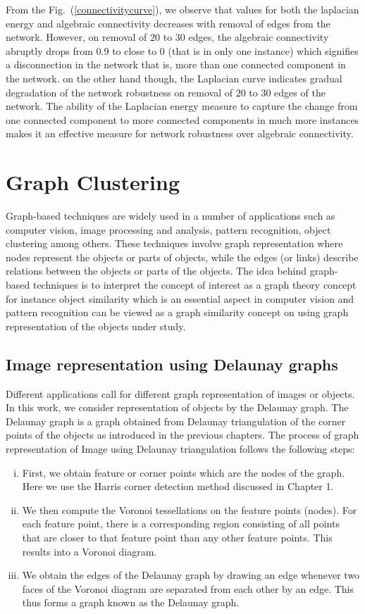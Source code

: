 \documentclass[10pt,a4paper]{article}
\begin{document}
From the Fig.~(\ref{connectivitycurve}), we observe that values for both the laplacian energy and algebraic connectivity decreases with removal of edges from the network. However, on removal of $20$ to $30$ edges, the algebraic connectivity abruptly drops from $0.9$ to close to $0$ (that is in only one instance) which signifies a disconnection in the network that is, more than one connected component in the network. on the other hand though, the Laplacian curve indicates gradual degradation of the network robustness on removal of $20$ to $30$ edges of the network. The ability of the Laplacian energy measure to capture the change from one connected component to more connected components in much more instances makes it an effective measure for network robustness over algebraic connectivity.


\section{Graph Clustering}

Graph-based techniques are widely used in a number of applications such as computer vision,  image processing and analysis, pattern recognition, object clustering among others. These techniques involve graph representation where nodes represent the objects or parts of objects, while the edges (or links) describe relations between the objects or parts of the objects. The idea behind graph-based techniques is to interpret the concept of interest as a graph theory concept for instance object similarity which is an essential aspect in computer vision and pattern recognition can be viewed as a graph similarity concept on using graph representation of the objects under study.

\subsection{Image representation using Delaunay graphs} 
Different applications call for different graph representation of images or objects. In this work, we consider representation of objects by the Delaunay graph. The Delaunay graph is a graph obtained from Delaunay triangulation of the corner points of the objects as introduced in the previous chapters. The process of graph representation of Image using Delaunay triangulation follows the following steps:
\begin{enumerate}[i)]
	\item First, we obtain feature or corner points which are the nodes of the graph. Here we use the Harris corner detection method discussed in Chapter 1.
	\item  We then compute the Voronoi tessellations on the feature points (nodes). For each feature point, there is a corresponding region consisting of all points that are closer to that feature point than any other feature points. This results into a Voronoi diagram.
	\item We obtain the edges of the Delaunay graph by drawing an edge whenever two faces of the Voronoi diagram are separated from each other by an edge. This thus forms a graph known as the Delaunay graph.
\end{enumerate}
\end{document}
